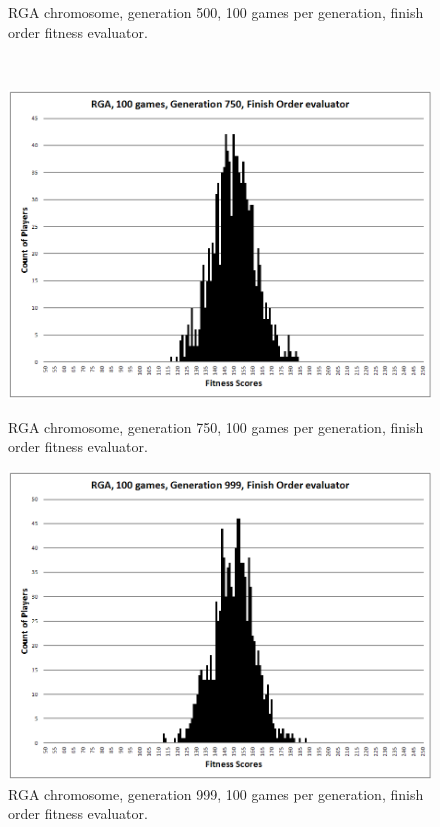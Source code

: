 \begin{figure}
\begin{minipage}[t]{0.47\linewidth}
\caption[RGA Fitness Distribution, 500th Generation]{RGA chromosome, generation
500, 100 games per generation, finish order fitness evaluator.} \label{figure-RGA-500th_gen_fitness}
\end{minipage}
\\[\intextsep]

\begin{minipage}[t]{0.47\linewidth}
\centering
\includegraphics[width=1.0\linewidth]{Figures/RGA_1024_G750_N100_FO.png}
\caption[RGA Fitness Distribution, 750th Generation]{RGA chromosome, generation
750, 100 games per generation, finish order fitness evaluator.} \label{figure-RGA-750th_gen_fitness}
\end{minipage}%
\hspace{0.06\linewidth}%
\begin{minipage}[t]{0.47\linewidth}
\centering
\includegraphics[width=1.0\linewidth]{Figures/RGA_1024_G999_N100_FO.png}
\caption[RGA Fitness Distribution, 999th Generation]{RGA chromosome, generation
999, 100 games per generation, finish order fitness evaluator.} \label{figure-RGA-999th_gen_fitness}

\end{minipage}
\end{figure}

